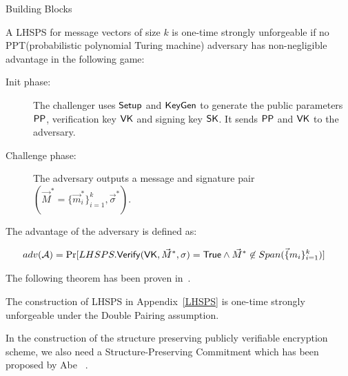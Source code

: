 \begin{subsection}{Building Blocks}
  \begin{myDef} A LHSPS for message vectors of size $k$ is one-time strongly unforgeable if no PPT(probabilistic polynomial Turing machine) adversary has non-negligible advantage in the following game:
    \begin{description}
    \item[Init phase: ]The challenger uses ${\mathsf{Setup}}$ and ${\mathsf{KeyGen}}$ to generate the public parameters $\mathsf{PP}$, verification key $\mathsf{VK}$ and signing key $\mathsf{SK}$. It sends $\mathsf{PP}$ and $\mathsf{VK}$ to the adversary.
    \item[Challenge phase: ] The adversary outputs a message and signature pair $(\vec{M}^* = \{\vec{m}_i^*\}_{i=1}^k, \vec{\sigma}^*)$.
    \end{description}
    
    The advantage of the adversary is defined as:
    
    \begin{align*}
      adv(\mathcal{A}) &= \operatorname{Pr}[LHSPS.{\mathsf{Verify}}(\mathsf{VK}, \vec{M}^* , \sigma) = \mathsf{True} \wedge \vec{M}^* \not \in Span(\vec\{m_i\}_{i=1}^k)]
    \end{align*}

  \end{myDef}

  The following theorem has been proven in~\cite{DBLP:journals/dcc/LibertPJY15}.
  
  \begin{myTh}
    The construction of LHSPS in Appendix~\ref{LHSPS} is one-time strongly unforgeable under the Double Pairing assumption.
  \end{myTh}
  














  In the construction of the structure preserving publicly verifiable encryption scheme, we also need a Structure-Preserving Commitment which has been proposed by Abe \etal~\cite{DBLP:conf/eurocrypt/AbeKOT15}.


\end{subsection}
